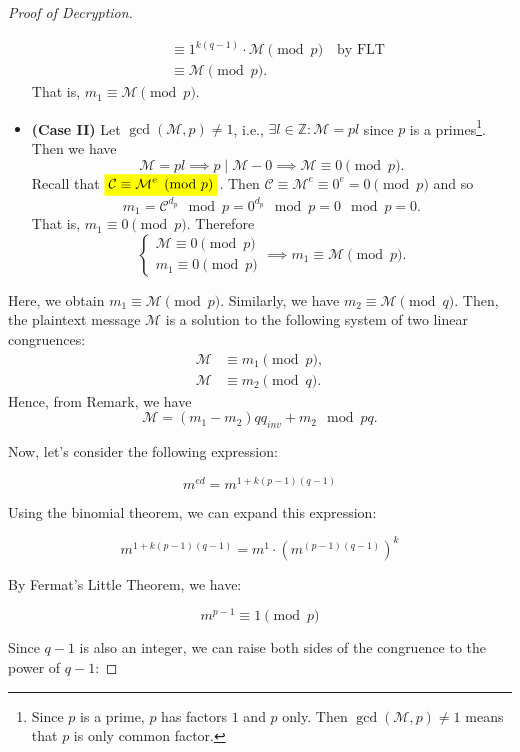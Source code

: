 \documentclass{article}
\newcommand{\mathcolorbox}[2]{\colorbox{#1}{$\displaystyle #2$}}
\newcommand{\ie}{\textnormal{i.e.}}
\theoremstyle{definition}
\newcommand{\Z}{\mathbb{Z}}
\newcommand{\of}[1]{\left( #1 \right)}
\begin{document}
\begin{proof}[Proof of Decryption]
\begin{itemize}
\begin{tcolorbox}[colback=white,colframe=black,arc=5pt,title={\color{white}\bf }]
\begin{align*}
				&\equiv 1^{k(q-1)}\cdot\mathcal{M}\pmod{p}\quad\text{by FLT}\\
				&\equiv\mathcal{M}\pmod{p}.
				\end{align*} That is, $m_1\equiv\mathcal{M}\pmod{p}$.
			\end{tcolorbox}
			\item[] \begin{tcolorbox}[colback=white,colframe=black,arc=5pt,title={\color{white}\bf }]
				\textbf{(Case II)} Let $\gcd\of{\mathcal{M},p}\neq 1$, \ie, $\exists l\in\Z:\mathcal{M}=pl$ since $p$ is a primes\footnote{Since $p$ is a prime, $p$ has factors $1$ and $p$ only. Then $\gcd\of{\mathcal{M},p}\neq 1$ means that $p$ is only common factor.}. Then we have \[
				\mathcal{M}=pl\implies p\mid\mathcal{M}-0\implies\mathcal{M}\equiv 0\pmod{p}.
				\] Recall that $\mathcolorbox{-blue}{\mathcal{C}\equiv\mathcal{M}^e\pmod{p}}$. Then $\mathcal{C}\equiv\mathcal{M}^e\equiv 0^e=0\pmod{p}$ and so\[
				m_1=\mathcal{C}^{d_p}\mod p=0^{d_p}\mod p= 0\mod p=0.
				\] That is, $m_1\equiv 0\pmod{p}$. Therefore \[
				\begin{cases}
				\mathcal{M}\equiv 0\pmod{p}\\
				m_1\equiv 0\pmod{p}
				\end{cases}\implies m_1\equiv\mathcal{M}\pmod{p}.
				\] 
			\end{tcolorbox}
		\end{itemize} 
		Here, we obtain $m_1\equiv\mathcal{M}\pmod{p}$. Similarly, we have $m_2\equiv\mathcal{M}\pmod{q}$. Then, the plaintext message $\mathcal{M}$ is a solution to the following system of two linear congruences: \begin{align*}
		\mathcal{M}&\equiv m_1\pmod{p},\\
		\mathcal{M}&\equiv m_2\pmod{q}.
		\end{align*}
		Hence, from Remark, we have \[
		\mathcal{M}=(m_1-m_2)qq_{inv}+m_2\mod pq.
		\]
		
		\newpage
		Now, let's consider the following expression:
		
		$$m^{ed} = m^{1 + k(p-1)(q-1)}$$
		
		Using the binomial theorem, we can expand this expression:
		
		$$m^{1 + k(p-1)(q-1)} = m^1 \cdot (m^{(p-1)(q-1)})^k$$
		
		By Fermat's Little Theorem, we have:
		
		$$m^{p-1} \equiv 1 \pmod{p}$$
		
		Since $q-1$ is also an integer, we can raise both sides of the congruence to the power of $q-1$:
		

\end{proof}
\end{document}
